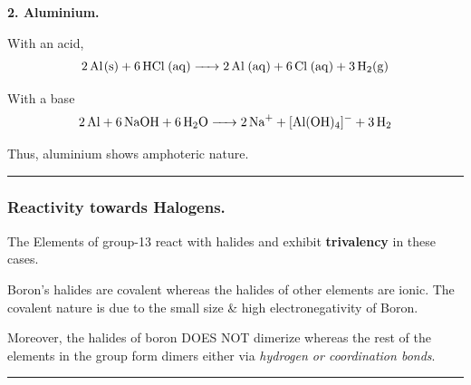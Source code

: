 \documentclass[twocolumn]{article}
\begin{document}
\vspace*{0.1in} 

\noindent 
\textbf{2. Aluminium.}

With an acid,
\[
    \ce{ 2Al(s) + 6HCl (aq) -> 2Al (aq) + 6Cl (aq) + 3H2(g) }
\]

With a base
\[
    \ce{  2Al + 6NaOH + 6H2O -> 2Na+ + [Al(OH)4]- + 3H2}
\]

Thus, aluminium shows amphoteric nature. 

\vspace*{0.1in} 
\hrule

\subsubsection*{Reactivity towards Halogens.}

The Elements of group-13 react with halides and exhibit \textbf{trivalency} in these cases. 

\begin{imp}
    Boron's halides are covalent whereas the halides of other elements are ionic. The covalent nature is due to the small size \& high electronegativity of Boron.
\end{imp}

Moreover, the halides of boron DOES NOT dimerize whereas the rest of the elements in the group form dimers either via \textit{hydrogen or coordination bonds}. 

\vspace*{0.1in} 
\hrule
\end{document}
